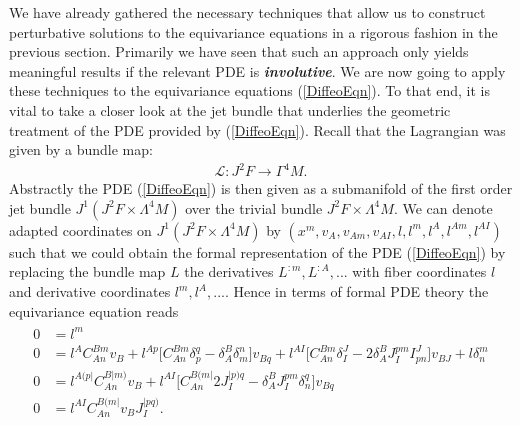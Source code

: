 \documentclass[a4paper,12pt, DIV=14, BCOR=5mm, twoside, headsepline, numbers=noenddot]{scrbook}
\begin{document}
We have already gathered the necessary techniques that allow us to construct perturbative solutions to the equivariance equations in a rigorous fashion in the previous section. Primarily we have seen that such an approach only yields meaningful results if the relevant PDE is \textit{\textbf{involutive}}. We are now going to apply these techniques to the equivariance equations (\ref{DiffeoEqn}). To that end, it is vital to take a closer look at the jet bundle that underlies the geometric treatment of the PDE provided by (\ref{DiffeoEqn}). Recall that the Lagrangian was given by a bundle map:
\begin{align}
\mathcal{L} : J^2F \longrightarrow \Gamma^4M.
\end{align}
Abstractly the PDE (\ref{DiffeoEqn}) is then given as a submanifold of the first order jet bundle $J^1(J^2F \times \Lambda^4M)$ over the trivial bundle $J^2F \times \Lambda^4M$. 
We can denote adapted coordinates on $J^1(J^2F \times \Lambda^4M)$ by $(x^m,v_A,v_{Am},v_{AI},l,l^{m},l^{A},l^{Am},l^{AI})$ such that we could obtain the formal representation of the PDE (\ref{DiffeoEqn}) by replacing the bundle map $L$ the derivatives $L^{:m},L^{:A},...$ with fiber coordinates $l$ and derivative coordinates $l^m,l^A,...$. Hence in terms of formal PDE theory the equivariance equation reads 
\begin{align}\label{DiffeoEqnFormal}
\begin{aligned}
    0 &= l^{m} \\
    0 &= l^{A} C_{An}^{Bm} v_B + l^{Ap} \bigl[ C_{An}^{Bm} \delta_p^q - \delta_A^B \delta_m^n \bigr] v_{Bq} + l^{AI} \bigl[ C_{An}^{Bm} \delta_I^J - 2 \delta_A^B J_I^{pm} I^J_{pn}  \bigr] v_{BJ} + l \delta^m_n \\
    0 &= l^{A(p\vert}C_{An}^{B \vert m)} v_B + l^{ AI} \bigl[ C_{An}^{B(m\vert} 2 J_I^{\vert p) q} - \delta^B_A J_I ^{pm} \delta_n^q \bigr] v_{Bq} \\
    0 &= l^{AI} C_{An}^{B(m\vert} v_B J_I^{\vert p q )}.
    \end{aligned}
\end{align}
\end{document}
